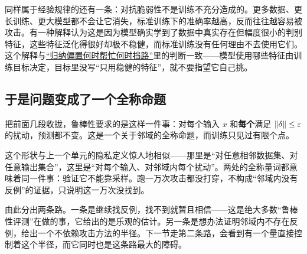 同样属于经验规律的还有一条：对抗脆弱性不是训练不充分造成的。更多数据、更长训练、更大模型都不会让它消失，标准训练下的准确率越高，反而往往越容易被攻击。有一种解释认为这是因为模型确实学到了数据中真实存在但幅度很小的判别特征，这些特征泛化得很好却极不稳健，而标准训练没有任何理由不去使用它们。这个解释与\hyperref[sec:14-Deep-Learning/04-Convolutional-Networks/05]{``归纳偏置何时帮忙何时挡路''}里的判断一致——模型使用哪些特征由训练目标决定，目标里没写``只用稳健的特征''，就不要指望它自己挑。

\subsection{于是问题变成了一个全称命题}

把前面几段收拢，鲁棒性要求的是这样一件事：对每个输入 \(x\) 和\textbf{每个}满足 \(\left\lVert\delta\right\rVert\le\varepsilon\) 的扰动，预测都不变。这是一个关于邻域的全称命题，而训练只见过有限个点。

这个形状与上一个单元的隐私定义惊人地相似——那里是``对任意相邻数据集、对任意输出集合''，这里是``对每个输入、对邻域内每个扰动''。两处的全称量词都意味着同一件事：验证它不能靠采样。跑一万次攻击都没打穿，不构成``邻域内没有反例''的证据，只说明这一万次没找到。

由此分出两条路。一条是继续找反例，找不到就暂且相信——这是绝大多数``鲁棒性评测''在做的事，它给出的是乐观的估计。另一条是想办法证明邻域内不存在反例，给出一个不依赖攻击方法的半径。下一节走第二条路，会看到有一个量直接控制着这个半径，而它同时也是这条路最大的障碍。
